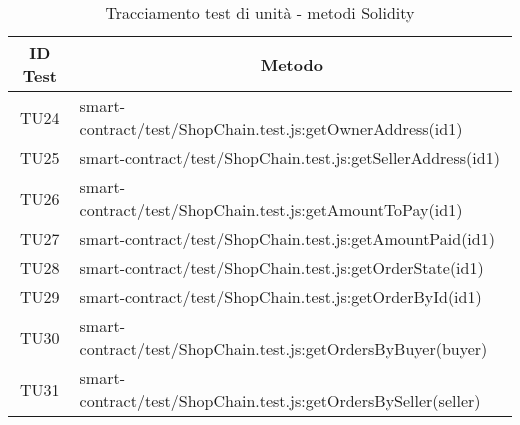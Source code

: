 \begin{table}[H]
  \centering
  \renewcommand{\arraystretch}{1.8}
  \begin{tabular}{c|p{15cm}}
    \rowcolor[HTML]{125E28}
    \color[HTML]{FFFFFF}\textbf{ID Test}
         & \multicolumn{1}{c}{\color[HTML]{FFFFFF}\textbf{Metodo}}                                                                                       \\
    \hline
    TU24 & smart-contract/test/ShopChain.test.js:getOwnerAddress(id1)                                                                                    \\
    TU25 & smart-contract/test/ShopChain.test.js:getSellerAddress(id1)                                                                                   \\
    TU26 & smart-contract/test/ShopChain.test.js:getAmountToPay(id1)                                                                                     \\
    TU27 & smart-contract/test/ShopChain.test.js:getAmountPaid(id1)                                                                                      \\
    TU28 & smart-contract/test/ShopChain.test.js:getOrderState(id1)                                                                                      \\
    TU29 & smart-contract/test/ShopChain.test.js:getOrderById(id1)                                                                                       \\
    TU30 & smart-contract/test/ShopChain.test.js:getOrdersByBuyer(buyer)                                                                                 \\
    TU31 & smart-contract/test/ShopChain.test.js:getOrdersBySeller(seller)                                                                               \\
  \end{tabular}
  \caption{Tracciamento test di unità - metodi Solidity}
\end{table}